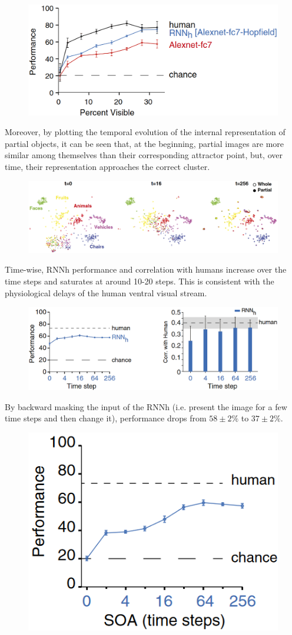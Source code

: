 \begin{casestudy}
\begin{descriptionlist}
            \begin{figure}[H]
                \centering
                \includegraphics[width=0.45\linewidth]{./img/pattern_completion6.png}
            \end{figure}
        
            Moreover, by plotting the temporal evolution of the internal representation of partial objects, 
            it can be seen that, at the beginning, partial images are more similar among themselves than their corresponding attractor point,
            but, over time, their representation approaches the correct cluster.
            \begin{figure}[H]
                \centering
                \includegraphics[width=0.7\linewidth]{./img/pattern_completion7.png}
            \end{figure}
        
            Time-wise, RNNh performance and correlation with humans increase over the time steps and saturates at around 10-20 steps.
            This is consistent with the physiological delays of the human ventral visual stream.
            \begin{figure}[H]
                \centering
                \includegraphics[width=0.55\linewidth]{./img/pattern_completion8.png}
            \end{figure}
        
            By backward masking the input of the RNNh (i.e. present the image for a few time steps and then change it), performance drops from $58 \pm 2\%$ to $37 \pm 2\%$.
            \begin{figure}[H]
                \centering
                \includegraphics[width=0.25\linewidth]{./img/pattern_completion9.png}
            \end{figure}
    \end{descriptionlist}
\end{casestudy}



